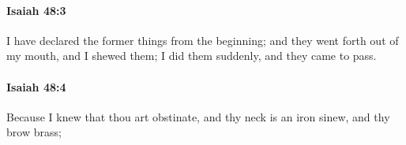 		\paragraph{Isaiah 48:3} %
			\label{ISAIAH-48-3}

			I have declared the former things from the beginning; and they went forth out of my mouth, and I shewed them; I did them suddenly, and they came to pass.


		\paragraph{Isaiah 48:4} %
			\label{ISAIAH-48-4}

			Because I knew that thou art obstinate, and thy neck is an iron sinew, and thy brow brass;


